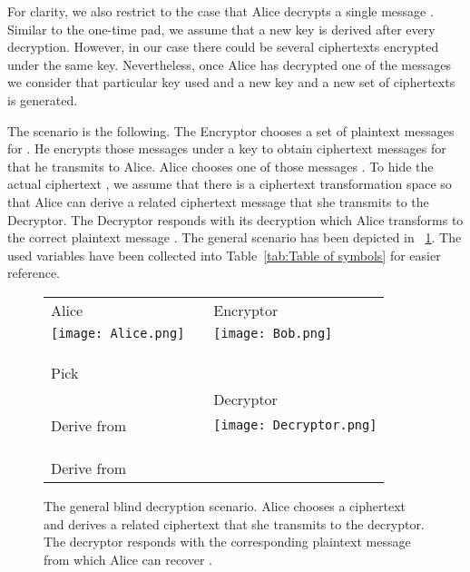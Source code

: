 \documentclass[10pt,journal]{IEEEtran}
\begin{document}
For clarity, we also restrict to the case that Alice decrypts a single message . Similar to the one-time pad, we assume
that a new key is derived after every decryption.
However, in our case there could be several ciphertexts
 encrypted under the same key.
Nevertheless, once Alice has decrypted one of the messages
we consider that particular key used and a new key and a new set of ciphertexts is generated.

The scenario is the following.
The Encryptor chooses a set of  plaintext messages  for .
He encrypts those messages under a key  to obtain ciphertext
messages  for  that he transmits to Alice.
Alice chooses one of those messages .
To hide the actual ciphertext , we assume that there is a
ciphertext transformation space  so that
Alice can derive a related ciphertext message 
that she transmits to the Decryptor. The Decryptor responds
with its decryption 
which Alice transforms to the correct plaintext message .
The general scenario has been depicted in \figurename~\ref{fig:general_scenario}.
The used variables have been collected into Table~\ref{tab:Table of symbols} for easier reference.
\begin{figure}[!t]
\centering
\begin{tabular}{lcl}
Alice & & Encryptor \\
\texttt{[image: Alice.png]} & & \texttt{[image: Bob.png]}\\
& &  \\
& &  \\
 &  &  \\
Pick  & & \\
& & Decryptor\\
Derive  from  & & \texttt{[image: Decryptor.png]}\\
 &  &  \\
& &  \\
 &  &  \\
Derive  from  & & \\
\end{tabular}
\caption{The general blind decryption scenario. Alice chooses a ciphertext  and derives a related ciphertext  that she transmits to the decryptor. The decryptor responds with the corresponding plaintext message  from which Alice can recover .}
\label{fig:general_scenario}
\end{figure}
\end{document}
